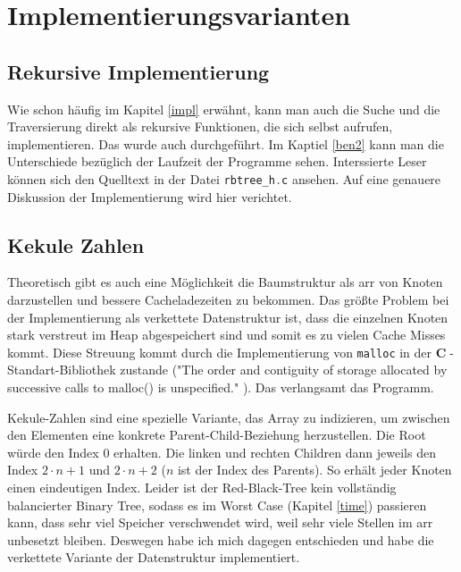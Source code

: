 \documentclass[11pt]{article}
\newcommand{\lstin}[1]{\lstinline[language=C]{#1}}
\newcommand{\cpl}{\textbf{C}$\;$}
\begin{document}
\section{Implementierungsvarianten}

\subsection{Rekursive Implementierung} 
Wie schon häufig im Kapitel \ref{impl} erwähnt, kann man auch die Suche und die Traversierung direkt als rekursive Funktionen, die sich selbst aufrufen, implementieren. Das wurde auch durchgeführt. Im Kaptiel \ref{ben2} kann man die Unterschiede bezüglich der Laufzeit der Programme sehen.
Interssierte Leser können sich den Quelltext in der Datei \lstin{rbtree_h.c} ansehen. Auf eine genauere Diskussion der Implementierung wird hier verichtet.

\subsection{Kekule Zahlen}
Theoretisch gibt es auch eine Möglichkeit die Baumstruktur als \gls{arr} von Knoten darzustellen und bessere Cacheladezeiten zu bekommen.
Das größte Problem bei der Implementierung als verkettete Datenstruktur ist, dass die einzelnen Knoten stark verstreut im Heap abgespeichert sind und somit es zu vielen Cache Misses kommt. Diese Streuung kommt durch die Implementierung von \lstin{malloc} in der \cpl-Standart-Bibliothek zustande ("The order and contiguity of storage allocated by successive calls to malloc() is unspecified." \cite{IEEEmalloc}). Das verlangsamt das Programm.

Kekule-Zahlen sind eine spezielle Variante, das Array zu indizieren, um zwischen den Elementen eine konkrete Parent-Child-Beziehung herzustellen. 
Die Root würde den Index 0 erhalten. Die linken und rechten Children dann jeweils den Index $2 \cdot n + 1$ und $2 \cdot n + 2$ ($n$ ist der Index des Parents). \cite{kek} So erhält jeder Knoten einen eindeutigen Index.
Leider ist der Red-Black-Tree kein vollständig balancierter Binary Tree, sodass es im Worst Case (Kapitel \ref{time}) passieren kann, dass sehr viel Speicher verschwendet wird, weil sehr viele Stellen im \gls{arr} unbesetzt bleiben. Deswegen habe ich mich dagegen entschieden und habe die verkettete Variante der Datenstruktur implementiert.
\end{document}
